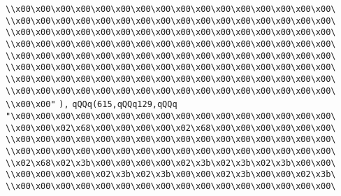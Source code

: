 \verb|\\x00\x00\x00\x00\x00\x00\x00\x00\x00\x00\x00\x00\x00\x00\x00\x00\|\newline
\verb|\\x00\x00\x00\x00\x00\x00\x00\x00\x00\x00\x00\x00\x00\x00\x00\x00\|\newline
\verb|\\x00\x00\x00\x00\x00\x00\x00\x00\x00\x00\x00\x00\x00\x00\x00\x00\|\newline
\verb|\\x00\x00\x00\x00\x00\x00\x00\x00\x00\x00\x00\x00\x00\x00\x00\x00\|\newline
\verb|\\x00\x00\x00\x00\x00\x00\x00\x00\x00\x00\x00\x00\x00\x00\x00\x00\|\newline
\verb|\\x00\x00\x00\x00\x00\x00\x00\x00\x00\x00\x00\x00\x00\x00\x00\x00\|\newline
\verb|\\x00\x00\x00\x00\x00\x00\x00\x00\x00\x00\x00\x00\x00\x00\x00\x00\|\newline
\verb|\\x00\x00\x00\x00\x00\x00\x00\x00\x00\x00\x00\x00\x00\x00\x00\x00\|\newline
\verb|\\x00\x00"|\newline
\verb|),|\newline
\verb|qQQq(615,qQQq129,qQQq|\newline
\verb|"\x00\x00\x00\x00\x00\x00\x00\x00\x00\x00\x00\x00\x00\x00\x00\x00\|\newline
\verb|\\x00\x00\x02\x68\x00\x00\x00\x00\x02\x68\x00\x00\x00\x00\x00\x00\|\newline
\verb|\\x00\x00\x00\x00\x00\x00\x00\x00\x00\x00\x00\x00\x00\x00\x00\x00\|\newline
\verb|\\x00\x00\x00\x00\x00\x00\x00\x00\x00\x00\x00\x00\x00\x00\x00\x00\|\newline
\verb|\\x02\x68\x02\x3b\x00\x00\x00\x00\x02\x3b\x02\x3b\x02\x3b\x00\x00\|\newline
\verb|\\x00\x00\x00\x00\x02\x3b\x02\x3b\x00\x00\x02\x3b\x00\x00\x02\x3b\|\newline
\verb|\\x00\x00\x00\x00\x00\x00\x00\x00\x00\x00\x00\x00\x00\x00\x00\x00\|\newline
